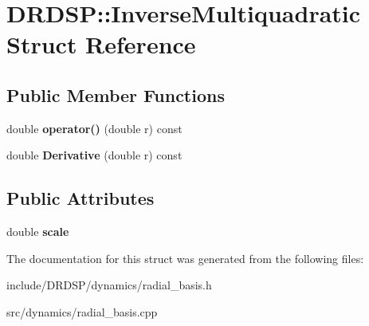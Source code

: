 \hypertarget{struct_d_r_d_s_p_1_1_inverse_multiquadratic}{\section{D\-R\-D\-S\-P\-:\-:Inverse\-Multiquadratic Struct Reference}
\label{struct_d_r_d_s_p_1_1_inverse_multiquadratic}
}
\subsection*{Public Member Functions}
\begin{DoxyCompactItemize}
\item 
\hypertarget{struct_d_r_d_s_p_1_1_inverse_multiquadratic_a513dbe313c51ad9ba2c9397c987563f7}{double {\bfseries operator()} (double r) const }\label{struct_d_r_d_s_p_1_1_inverse_multiquadratic_a513dbe313c51ad9ba2c9397c987563f7}

\item 
\hypertarget{struct_d_r_d_s_p_1_1_inverse_multiquadratic_af6a5298e54581ec417a06335c3757744}{double {\bfseries Derivative} (double r) const }\label{struct_d_r_d_s_p_1_1_inverse_multiquadratic_af6a5298e54581ec417a06335c3757744}

\end{DoxyCompactItemize}
\subsection*{Public Attributes}
\begin{DoxyCompactItemize}
\item 
\hypertarget{struct_d_r_d_s_p_1_1_inverse_multiquadratic_a39009875f833958785889ac9373ad37c}{double {\bfseries scale}}\label{struct_d_r_d_s_p_1_1_inverse_multiquadratic_a39009875f833958785889ac9373ad37c}

\end{DoxyCompactItemize}


The documentation for this struct was generated from the following files\-:\begin{DoxyCompactItemize}
\item 
include/\-D\-R\-D\-S\-P/dynamics/radial\-\_\-basis.\-h\item 
src/dynamics/radial\-\_\-basis.\-cpp\end{DoxyCompactItemize}
